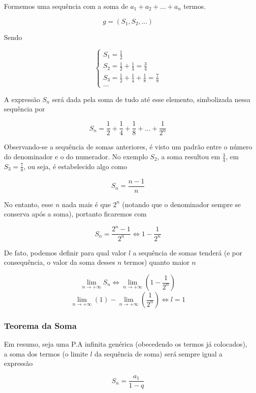 Formemos uma sequência com a soma de $a_{1} + a_{2} + \dots + a_{n}$ termos.

\[g = (S_{1}, S_{2}, \dots)\]

Sendo

\begin{equation*}
  \begin{cases}
    S_{1} = \frac{1}{2} \\
    S_{2} = \frac{1}{2} + \frac{1}{4} = \frac{3}{4} \\
    S_{3} = \frac{1}{2} + \frac{1}{4} + \frac{1}{8} = \frac{7}{8} \\
    \dots
  \end{cases}
\end{equation*}

A expressão $S_{n}$ será dada pela soma de tudo até esse elemento, simbolizada nessa sequência por

\[S_{n} = \frac{1}{2} + \frac{1}{4} + \frac{1}{8} + \dots + \frac{1}{2^{n}}\]

Observando-se a sequência de somas anteriores, é visto um padrão entre o número do denominador e o do numerador. No exemplo $S_{2}$, a soma resultou em $\frac{3}{4}$, em $S_{3} = \frac{7}{8}$, ou seja, é estabelecido algo como

\[S_{n} = \frac{n - 1}{n}\]

No entanto, esse $n$ nada mais é que $2^{n}$ (notando que o denominador sempre se conserva após a soma), portanto ficaremos com

\[S_{n} = \frac{2^{n} - 1}{2^{n}} \Leftrightarrow 1 - \frac{1}{2^{n}}\]

De fato, podemos definir para qual valor $l$ a sequência de somas tenderá (e por consequência, o valor da soma desses $n$ termos) quanto maior $n$

\[\lim_{n \to +\infty} S_{n} \Leftrightarrow \lim_{n\to +\infty} \left(1 - \frac{1}{2^{n}}\right)\]
\[\lim_{n\to +\infty} (1) - \lim_{n\to +\infty} \left(\frac{1}{2^{n}}\right) \Leftrightarrow l = 1\]

\subsubsection{Teorema da Soma}

Em resumo, seja uma P.A infinita genérica (obecedendo os termos já colocados), a soma dos termos (o limite $l$ da sequência de soma) será sempre igual a expressão

\begin{tcolorbox}[colback=LightYellow]
\[S_{n} = \frac{a_{1}}{1 - q}\]
\end{tcolorbox}
